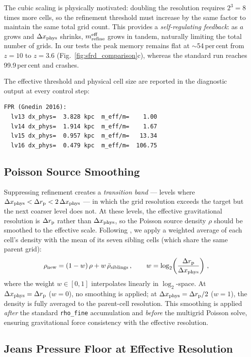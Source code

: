 \documentclass[fleqn,usenatbib]{mnras}
\newcommand{\code}[1]{\texttt{#1}}
\newcommand{\drp}{\Delta r_{\rm p}}
\newcommand{\dxp}{\Delta x_{\rm phys}}
\begin{document}
The cubic scaling is physically motivated: doubling the resolution
requires $2^3 = 8$ times more cells, so the refinement threshold must
increase by the same factor to maintain the same total grid count.
This provides a \emph{self-regulating feedback}: as $a$ grows and
$\dxp$ shrinks, $m_{\rm refine}^{\rm eff}$ grows in tandem, naturally
limiting the total number of grids.  In our tests the peak memory
remains flat at $\sim$54\,per\,cent from $z=10$ to $z=3.6$
(Fig.~\ref{fig:sfrd_comparison}c), whereas the standard run reaches
99.9\,per\,cent and crashes.

The effective threshold and physical cell size are reported in the
diagnostic output at every control step:
\begin{lstlisting}
FPR (Gnedin 2016):
  lv13 dx_phys=  3.828 kpc  m_eff/m=    1.00
  lv14 dx_phys=  1.914 kpc  m_eff/m=    1.67
  lv15 dx_phys=  0.957 kpc  m_eff/m=   13.34
  lv16 dx_phys=  0.479 kpc  m_eff/m=  106.75
\end{lstlisting}

\subsection{Poisson Source Smoothing}
\label{sec:fpr_smooth}

Suppressing refinement creates a \emph{transition band} ---
levels where $\dxp < \drp < 2\,\dxp$ --- in which the grid
resolution exceeds the target but the next coarser level does not.
At these levels, the effective gravitational resolution is $\drp$
rather than $\dxp$, so the Poisson source density $\rho$ should be
smoothed to the effective scale.  Following \citet{Gnedin2016}, we
apply a weighted average of each cell's density with the mean of its
seven sibling cells (which share the same parent grid):
\begin{equation}
  \rho_{\rm new} = (1-w)\,\rho + w\,\bar{\rho}_{\rm siblings}\,,
  \qquad w = \log_2\!\left(\frac{\drp}{\dxp}\right)\,,
  \label{eq:fpr_smooth}
\end{equation}
where the weight $w \in [0,1]$ interpolates linearly in
$\log_2$-space.  At $\dxp = \drp$ ($w=0$), no smoothing is applied;
at $\dxp = \drp/2$ ($w=1$), the density is fully averaged to the
parent-cell resolution.  This smoothing is applied \emph{after} the
standard \code{rho\_fine} accumulation and \emph{before} the
multigrid Poisson solve, ensuring gravitational force consistency with
the effective resolution.

\subsection{Jeans Pressure Floor at Effective Resolution}
\label{sec:fpr_jeans}
\end{document}
